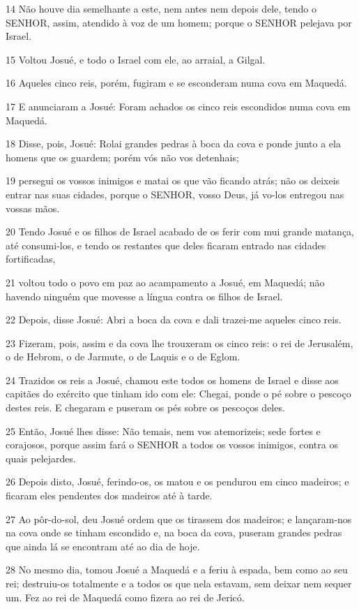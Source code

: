 \par 14 Não houve dia semelhante a este, nem antes nem depois dele, tendo o SENHOR, assim, atendido à voz de um homem; porque o SENHOR pelejava por Israel.
\par 15 Voltou Josué, e todo o Israel com ele, ao arraial, a Gilgal.
\par 16 Aqueles cinco reis, porém, fugiram e se esconderam numa cova em Maquedá.
\par 17 E anunciaram a Josué: Foram achados os cinco reis escondidos numa cova em Maquedá.
\par 18 Disse, pois, Josué: Rolai grandes pedras à boca da cova e ponde junto a ela homens que os guardem; porém vós não vos detenhais;
\par 19 persegui os vossos inimigos e matai os que vão ficando atrás; não os deixeis entrar nas suas cidades, porque o SENHOR, vosso Deus, já vo-los entregou nas vossas mãos.
\par 20 Tendo Josué e os filhos de Israel acabado de os ferir com mui grande matança, até consumi-los, e tendo os restantes que deles ficaram entrado nas cidades fortificadas,
\par 21 voltou todo o povo em paz ao acampamento a Josué, em Maquedá; não havendo ninguém que movesse a língua contra os filhos de Israel.
\par 22 Depois, disse Josué: Abri a boca da cova e dali trazei-me aqueles cinco reis.
\par 23 Fizeram, pois, assim e da cova lhe trouxeram os cinco reis: o rei de Jerusalém, o de Hebrom, o de Jarmute, o de Laquis e o de Eglom.
\par 24 Trazidos os reis a Josué, chamou este todos os homens de Israel e disse aos capitães do exército que tinham ido com ele: Chegai, ponde o pé sobre o pescoço destes reis. E chegaram e puseram os pés sobre os pescoços deles.
\par 25 Então, Josué lhes disse: Não temais, nem vos atemorizeis; sede fortes e corajosos, porque assim fará o SENHOR a todos os vossos inimigos, contra os quais pelejardes.
\par 26 Depois disto, Josué, ferindo-os, os matou e os pendurou em cinco madeiros; e ficaram eles pendentes dos madeiros até à tarde.
\par 27 Ao pôr-do-sol, deu Josué ordem que os tirassem dos madeiros; e lançaram-nos na cova onde se tinham escondido e, na boca da cova, puseram grandes pedras que ainda lá se encontram até ao dia de hoje.
\par 28 No mesmo dia, tomou Josué a Maquedá e a feriu à espada, bem como ao seu rei; destruiu-os totalmente e a todos os que nela estavam, sem deixar nem sequer um. Fez ao rei de Maquedá como fizera ao rei de Jericó.
